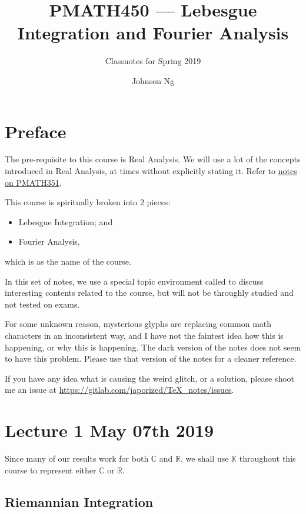 \documentclass[notoc,notitlepage]{tufte-book}
\title{PMATH450 --- Lebesgue Integration and Fourier Analysis}
\author{Johnson Ng}
\subtitle{Classnotes for Spring 2019}
\begin{document}


\chapter*{Preface}%
\label{chp:preface}

The pre-requisite to this course is Real Analysis. We will use a lot of the
concepts introduced in Real Analysis, at times without explicitly stating it.
Refer to \href{https://tex.japorized.ink/PMATH351F18/classnotes.pdf}{notes on
PMATH351}.

This course is spiritually broken into 2 pieces:
\begin{itemize}
  \item Lebesgue Integration; and
  \item Fourier Analysis,
\end{itemize}
which is as the name of the course.

In this set of notes, we use a special topic environment called
 to discuss interesting contents related to the course, but
will not be throughly studied and not tested on exams.

For some unknown reason, mysterious glyphs are replacing common math
characters in an inconsistent way, and I have not the faintest idea
how this is happening, or why this is happening.
The dark version of the notes does not seem to have this problem.
Please use that version of the notes for a cleaner reference.

If you have any idea what is causing the weird glitch,
or a solution, please shoot me an issue at
\url{https://gitlab.com/japorized/TeX_notes/issues}.


\chapter{Lecture 1 May 07th 2019}%
\label{chp:lecture_1_may_07th_2019}

Since many of our results work for both $\mathbb{C}$ and $\mathbb{R}$, we shall
use $\mathbb{K}$ throughout this course to represent either $\mathbb{C}$ or
$\mathbb{R}$.

\section{Riemannian Integration}%
\label{sec:riemannian_integration}
\end{document}
